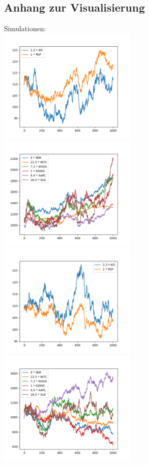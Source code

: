\documentclass[12pt]{article}
\begin{document}
	\subsection*{Anhang zur Visualisierung}
	Simulationen:
	\\
	\includegraphics[width=0.5\textwidth]{Teil1_1}	
	\includegraphics[width=0.5\textwidth]{Teil2_1}
	\includegraphics[width=0.5\textwidth]{Teil1_2}	
	\includegraphics[width=0.5\textwidth]{Teil2_2}
\end{document}
